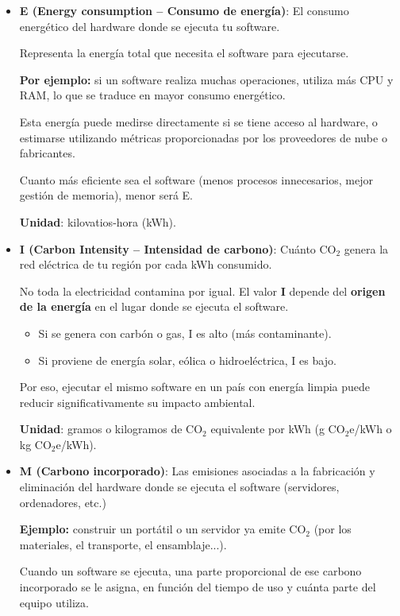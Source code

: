 \documentclass[12pt,a4paper]{report}
\begin{document}
\begin{itemize}
  \item \textbf{E (Energy consumption – Consumo de energía)}: El consumo energético del hardware donde se ejecuta tu software.

        Representa la energía total que necesita el software para ejecutarse.

        \textbf{Por ejemplo:} si un software realiza muchas operaciones, utiliza más CPU y RAM, lo que se traduce en mayor consumo energético.

        Esta energía puede medirse directamente si se tiene acceso al hardware, o estimarse utilizando métricas proporcionadas por los proveedores de nube o fabricantes.

        Cuanto más eficiente sea el software (menos procesos innecesarios, mejor gestión de memoria), menor será E.

        \textbf{Unidad}: kilovatios-hora (kWh).

  \item \textbf{I (Carbon Intensity – Intensidad de carbono)}: Cuánto CO$_2$ genera la red eléctrica de tu región por cada kWh consumido.

        No toda la electricidad contamina por igual. El valor \textbf{I} depende del \textbf{origen de la energía} en el lugar donde se ejecuta el software.

        \begin{itemize}
          \item Si se genera con carbón o gas, I es alto (más contaminante).
          \item Si proviene de energía solar, eólica o hidroeléctrica, I es bajo.
        \end{itemize}

        Por eso, ejecutar el mismo software en un país con energía limpia puede reducir significativamente su impacto ambiental.

        \textbf{Unidad}: gramos o kilogramos de CO$_2$ equivalente por kWh (g CO$_2$e/kWh o kg CO$_2$e/kWh).

  \item \textbf{M (Carbono incorporado)}: Las emisiones asociadas a la fabricación y eliminación del hardware donde se ejecuta el software (servidores, ordenadores, etc.)

        \textbf{Ejemplo:} construir un portátil o un servidor ya emite CO$_2$ (por los materiales, el transporte, el ensamblaje...).

        Cuando un software se ejecuta, una parte proporcional de ese carbono incorporado se le asigna, en función del tiempo de uso y cuánta parte del equipo utiliza.


\end{itemize}
\end{document}
